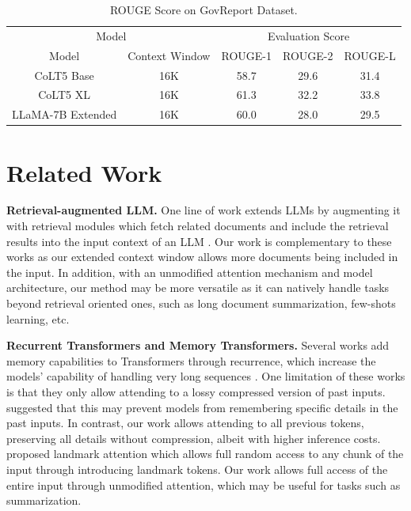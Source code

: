 \documentclass{article} %
\theoremstyle{definition}
\begin{document}
\begin{table}[]
    \centering
\begin{tabular}{ccccc}
\toprule
\multicolumn{2}{c}{Model} & \multicolumn{3}{c}{Evaluation Score}\\
Model & Context Window & ROUGE-1 & ROUGE-2 & ROUGE-L \\
\midrule
CoLT5 Base \citep{ainslie2023colt5} & 16K & 58.7 & 29.6 & 31.4 \\
CoLT5 XL \citep{ainslie2023colt5} & 16K &  61.3 & 32.2 & 33.8 \\
\midrule
LLaMA-7B Extended & 16K &  60.0 & 28.0 & 29.5 \\
\bottomrule
\end{tabular}
\caption{\small ROUGE Score on GovReport Dataset.}
\label{table:govreport}
\end{table}

\section{Related Work}

{\noindent \bf Retrieval-augmented LLM.} One line of work extends LLMs by augmenting it with retrieval modules which fetch related documents and include the retrieval results into the input context of an LLM \citep{karpukhin2020dense, guu2020realm, izacard2022atlas, jiang2022retrieval, khattab2021relevance, Santhanam2022colbertv2}. Our work is complementary to these works as our extended context window allows more documents being included in the input. In addition, with an unmodified attention mechanism and model architecture, our method may be more versatile as it can natively handle tasks beyond retrieval oriented ones, such as long document summarization, few-shots learning, etc.

{\noindent \bf Recurrent Transformers and Memory Transformers.} Several works add memory capabilities to Transformers through recurrence, which increase the models’ capability of handling very long sequences \citep{bulatov2022recurrent, wu2020memformer, dai2019transformerxl, wu2022memorizing, martins2021inftyformer, mu2023learning}. One limitation of these works is that they only allow attending to a lossy compressed version of past inputs. \citet{mu2023learning} suggested that this may prevent models from remembering specific details in the past inputs. In contrast, our work allows attending to all previous tokens, preserving all details without compression, albeit with higher inference costs. \citet{mohtashami2023landmark} proposed landmark attention which allows full random access to any chunk of the input through introducing landmark tokens. Our work allows full access of the entire input through unmodified attention, which may be useful for tasks such as summarization.
\end{document}
